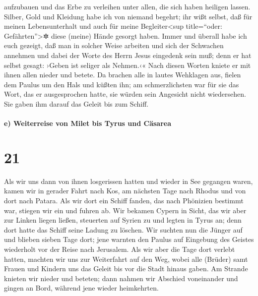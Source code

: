 aufzubauen und das Erbe zu verleihen unter allen, die sich haben
heiligen lassen.  Silber, Gold und Kleidung habe ich von
niemand begehrt;  ihr wißt selbst, daß für meinen
Lebensunterhalt und auch für meine Begleiter\textless sup title=``oder:
Gefährten''\textgreater✲ diese (meine) Hände gesorgt haben.
 Immer und überall habe ich euch gezeigt, daß man in
solcher Weise arbeiten und sich der Schwachen annehmen und dabei der
Worte des Herrn Jesus eingedenk sein muß; denn er hat selbst gesagt:
›Geben ist seliger als Nehmen.‹«  Nach diesen Worten
kniete er mit ihnen allen nieder und betete.  Da brachen
alle in lautes Wehklagen aus, fielen dem Paulus um den Hals und küßten
ihn;  am schmerzlichsten war für sie das Wort, das er
ausgesprochen hatte, sie würden sein Angesicht nicht wiedersehen. Sie
gaben ihm darauf das Geleit bis zum Schiff.

\hypertarget{e-weiterreise-von-milet-bis-tyrus-und-cuxe4sarea}{%
\paragraph{e) Weiterreise von Milet bis Tyrus und
Cäsarea}\label{e-weiterreise-von-milet-bis-tyrus-und-cuxe4sarea}}

\hypertarget{section-20}{%
\section{21}\label{section-20}}

 Als wir uns dann von ihnen losgerissen hatten und wieder
in See gegangen waren, kamen wir in gerader Fahrt nach Kos, am nächsten
Tage nach Rhodus und von dort nach Patara.  Als wir dort
ein Schiff fanden, das nach Phönizien bestimmt war, stiegen wir ein und
fuhren ab.  Wir bekamen Cypern in Sicht, das wir aber zur
Linken liegen ließen, steuerten auf Syrien zu und legten in Tyrus an;
denn dort hatte das Schiff seine Ladung zu löschen.  Wir
suchten nun die Jünger auf und blieben sieben Tage dort; jene warnten
den Paulus auf Eingebung des Geistes wiederholt vor der Reise nach
Jerusalem.  Als wir aber die Tage dort verlebt hatten,
machten wir uns zur Weiterfahrt auf den Weg, wobei alle (Brüder) samt
Frauen und Kindern uns das Geleit bis vor die Stadt hinaus gaben. Am
Strande knieten wir nieder und beteten;  dann nahmen wir
Abschied voneinander und gingen an Bord, während jene wieder
heimkehrten.

